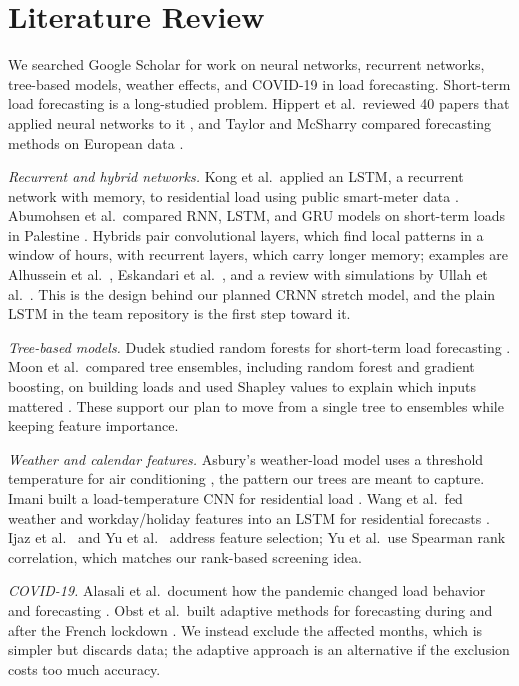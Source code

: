 \documentclass[10pt,letterpaper,twocolumn]{article}
\begin{document}
\section{Literature Review}
We searched Google Scholar for work on neural networks, recurrent networks, tree-based models, weather effects, and COVID-19 in load forecasting. Short-term load forecasting is a long-studied problem. Hippert et al.\ reviewed 40 papers that applied neural networks to it \cite{hippert}, and Taylor and McSharry compared forecasting methods on European data \cite{taylor}.

\textit{Recurrent and hybrid networks.} Kong et al.\ applied an LSTM, a recurrent network with memory, to residential load using public smart-meter data \cite{kong}. Abumohsen et al.\ compared RNN, LSTM, and GRU models on short-term loads in Palestine \cite{abumohsen}. Hybrids pair convolutional layers, which find local patterns in a window of hours, with recurrent layers, which carry longer memory; examples are Alhussein et al.\ \cite{alhussein}, Eskandari et al.\ \cite{eskandari}, and a review with simulations by Ullah et al.\ \cite{ullah}. This is the design behind our planned CRNN stretch model, and the plain LSTM in the team repository is the first step toward it.

\textit{Tree-based models.} Dudek studied random forests for short-term load forecasting \cite{dudek}. Moon et al.\ compared tree ensembles, including random forest and gradient boosting, on building loads and used Shapley values to explain which inputs mattered \cite{moon}. These support our plan to move from a single tree to ensembles while keeping feature importance.

\textit{Weather and calendar features.} Asbury's weather-load model uses a threshold temperature for air conditioning \cite{asbury}, the pattern our trees are meant to capture. Imani built a load-temperature CNN for residential load \cite{imani}. Wang et al.\ fed weather and workday/holiday features into an LSTM for residential forecasts \cite{wang}. Ijaz et al.\ \cite{ijaz} and Yu et al.\ \cite{yu} address feature selection; Yu et al.\ use Spearman rank correlation, which matches our rank-based screening idea.

\textit{COVID-19.} Alasali et al.\ document how the pandemic changed load behavior and forecasting \cite{alasali}. Obst et al.\ built adaptive methods for forecasting during and after the French lockdown \cite{obst}. We instead exclude the affected months, which is simpler but discards data; the adaptive approach is an alternative if the exclusion costs too much accuracy.
\end{document}

